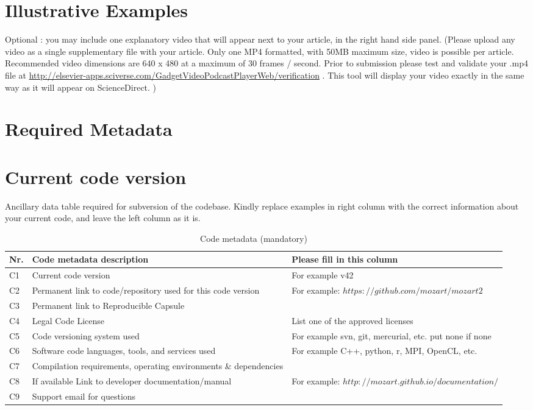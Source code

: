 \documentclass[preprint,12pt,letterpaper]{elsarticle}
\begin{document}
\section*{Illustrative Examples}
Optional : you may include one explanatory  video that will appear next to your article, in the right hand side panel. (Please upload any video as a single supplementary file with your article. Only one MP4 formatted, with 50MB maximum size, video is possible per article. Recommended video dimensions are 640 x 480 at a maximum of 30 frames / second. Prior to submission please test and validate your .mp4 file at  \url{http://elsevier-apps.sciverse.com/GadgetVideoPodcastPlayerWeb/verification} . This tool will display your video exactly in the same way as it will appear on ScienceDirect. )


\section*{Required Metadata}

\section*{Current code version}

Ancillary data table required for subversion of the codebase. Kindly replace examples in right column with the correct information about your current code, and leave the left column as it is.

\begin{table}[!h]
\begin{tabular}{|l|p{6.5cm}|p{6.5cm}|}
\hline
\textbf{Nr.} & \textbf{Code metadata description} & \textbf{Please fill in this column} \\
\hline
C1 & Current code version & For example v42 \\
\hline
C2 & Permanent link to code/repository used for this code version & For example: $https://github.com/mozart/mozart2$ \\
\hline
C3  & Permanent link to Reproducible Capsule & \\
\hline
C4 & Legal Code License   & List one of the approved licenses \\
\hline
C5 & Code versioning system used & For example svn, git, mercurial, etc. put none if none \\
\hline
C6 & Software code languages, tools, and services used & For example C++, python, r, MPI, OpenCL, etc. \\
\hline
C7 & Compilation requirements, operating environments \& dependencies & \\
\hline
C8 & If available Link to developer documentation/manual & For example: $http://mozart.github.io/documentation/$ \\
\hline
C9 & Support email for questions & \\
\hline
\end{tabular}
\caption{Code metadata (mandatory)}
\end{table}
\end{document}
